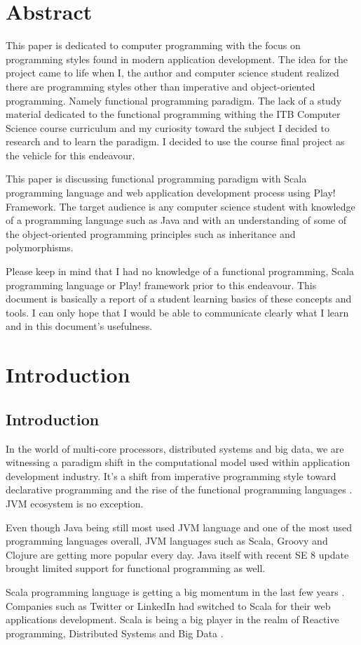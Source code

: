 \documentclass[12pt,twoside,a4paper]{report}
\begin{document}
\chapter*{Abstract}
This paper is dedicated to computer programming with the focus on programming styles found in modern application development. The idea for the project came to life when I, the author and computer science student realized there are programming styles other than imperative and object-oriented programming. Namely functional programming paradigm. The lack of a study material dedicated to the functional programming withing the ITB Computer Science course curriculum and my curiosity toward the subject I decided to research and to learn the paradigm. I decided to use the course final project as the vehicle for this endeavour.\par
This paper is discussing functional programming paradigm with Scala programming language and web application development process using Play! Framework. The target audience is any computer science student with knowledge of a programming language such as Java and with an understanding of some of the object-oriented programming principles such as inheritance and polymorphisms.\par
Please keep in mind that I had no knowledge of a functional programming, Scala programming language or Play! framework prior to this endeavour. This document is basically a report of a student learning basics of these concepts and tools. I can only hope that I would be able to communicate clearly what I learn and in this document's usefulness.

\listoffigures
\listoftables
\tableofcontents{}

\chapter{Introduction}\label{1}
\section{Introduction}\label{1.1}
In the world of multi-core processors, distributed systems and big data, we are witnessing a paradigm shift in the computational model used within application development industry. It's a shift from imperative programming style toward declarative programming and the rise of the functional programming languages \cite{1}. JVM ecosystem is no exception.\par
Even though Java being still most used JVM language and one of the most used programming languages overall, JVM languages such as Scala, Groovy and Clojure are getting more popular every day. Java itself with recent SE 8 update brought limited support for functional programming as well.\par
Scala programming language \cite{2} is getting a big momentum in the last few years \cite{3}. Companies such as Twitter or LinkedIn \cite{4} had switched to Scala for their web applications development. Scala is being a big player in the realm of Reactive programming, Distributed Systems and Big Data \cite{5}.
\end{document}
